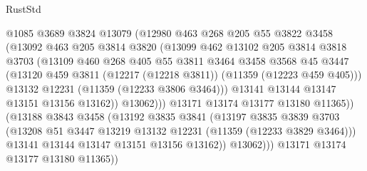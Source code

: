 \begin{lexlean}{RustStd}
\begin{coremodule}
{{{{{{{{{{{{{{{{{{{                        @1085
                        @3689
                        @3824
                        @13079
                        (@12980
                          @463
                          @268
                          @205
                          @55
                          @3822
                          @3458
                          (@13092
                            @463
                            @205
                            @3814
                            @3820
                            (@13099
                              @462
                              @13102
                              @205
                              @3814
                              @3818
                              @3703
                              (@13109
                                @460
                                @268
                                @405
                                @55
                                @3811
                                @3464
                                @3458
                                @3568
                                @45
                                @3447
                                (@13120
                                  @459
                                  @3811
                                  (@12217 (@12218 @3811))
                                  (@11359 (@12223 @459 @405)))
                                @13132
                                @12231
                                (@11359 (@12233 @3806 @3464)))
                              @13141
                              @13144
                              @13147
                              @13151
                              @13156
                              @13162))
                          @13062)))
                    @13171
                    @13174
                    @13177
                    @13180
                    @11365))
                (@13188
                  @3843
                  @3458
                  (@13192
                    @3835
                    @3841
                    (@13197
                      @3835
                      @3839
                      @3703
                      (@13208 @51 @3447 @13219 @13132 @12231 (@11359 (@12233 @3829 @3464)))
                      @13141
                      @13144
                      @13147
                      @13151
                      @13156
                      @13162))
                  @13062)))
            @13171
            @13174
            @13177
            @13180
            @11365))
}}}}}}}}}}}}}}}}}}}
\end{coremodule}
\end{lexlean}
